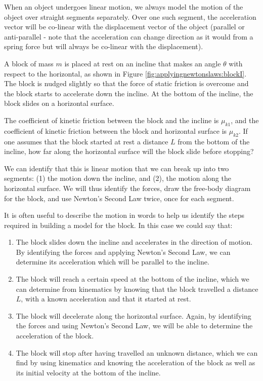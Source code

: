 When an object undergoes linear motion, we always model the motion of the object over straight segments separately. Over one such segment, the acceleration vector will be co-linear with the displacement vector of the object (parallel or anti-parallel - note that the acceleration can change direction as it would from a spring force but will always be co-linear with the displacement).

\begin{example}{\label{ex:applyingnewtonslaws:block}A block of mass $m$ is placed at rest on an incline that makes an angle $\theta$ with respect to the horizontal, as shown in Figure \ref{fig:applyingnewtonslaws:blockI}. The block is nudged slightly so that the force of static friction is overcome and the block starts to accelerate down the incline. At the bottom of the incline, the block slides on a horizontal surface.

The coefficient of kinetic friction between the block and the incline is $\mu_{k1}$, and the coefficient of kinetic friction between the block and horizontal surface is $\mu_{k2}$. If one assumes that the block started at rest a distance $L$ from the bottom of the incline, how far along the horizontal surface will the block slide before stopping?}
We can identify that this is linear motion that we can break up into two segments: (1) the motion down the incline, and (2), the motion along the horizontal surface. We will thus identify the forces, draw the free-body diagram for the block, and use Newton's Second Law twice, once for each segment.

It is often useful to describe the motion in words to help us identify the steps required in building a model for the block. In this case we could say that:
\begin{enumerate}
\item The block slides down the incline and accelerates in the direction of motion. By identifying the forces and applying Newton's Second Law, we can determine its acceleration which will be parallel to the incline.
\item The block will reach a certain speed at the bottom of the incline, which we can determine from kinematics by knowing that the block travelled a distance $L$, with a known acceleration and that it started at rest.
\item The block will decelerate along the horizontal surface. Again, by identifying the forces and using Newton's Second Law, we will be able to determine the acceleration of the block.
\item The block will stop after having travelled an unknown distance, which we can find by using kinematics and knowing the acceleration of the block as well as its initial velocity at the bottom of the incline.
\end{enumerate}


\end{example}

